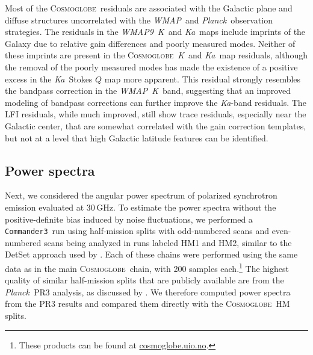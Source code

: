 \documentclass[twocolumn]{../../common/aa}
\def\WMAP{\emph{WMAP}}
\def\WMAPnine{\emph{WMAP9}}
\def\Planck{\emph{Planck}}
\def\commanderthree{\texttt{Commander3}}
\newcommand{\cosmoglobe}{\textsc{Cosmoglobe}}
\newcommand{\K}[0]{\textit K}
\newcommand{\Ka}[0]{\textit{Ka}}
\begin{document}
Most of the \cosmoglobe\ residuals are associated with the Galactic plane and diffuse structures uncorrelated with the \WMAP\ and \Planck\ observation strategies. 
The residuals in the \WMAPnine\ \K\ and \Ka\ maps include imprints of the Galaxy due to relative gain differences and poorly measured modes. Neither of these imprints are present in the \cosmoglobe\ \K\ and \Ka\ map residuals, although the removal of the poorly measured modes has made the existence of a positive excess in the \Ka\ Stokes $Q$ map more apparent.
This residual  strongly resembles the bandpass correction in the \WMAP\ \K\ band, suggesting that an improved modeling of bandpass corrections can further improve the \Ka-band residuals.
The LFI residuals, while much improved, still show trace residuals, especially near the Galactic center, that are somewhat correlated with the gain correction templates, but not at a level that high Galactic latitude features can be identified. 



\subsection{Power spectra}
\label{sec:powspec}


Next, we considered the angular power spectrum of polarized synchrotron emission evaluated at 30\,GHz. To estimate the power spectra without the positive-definite bias induced by noise fluctuations, we performed a \commanderthree\ run using half-mission splits with odd-numbered scans and even-numbered scans being analyzed in runs labeled HM1 and HM2, similar to the DetSet approach used by \citet{planck2014-XXX}. Each of these chains were performed using the same data as in the main \cosmoglobe\ chain, with 200 samples each.\footnote{These products can be found at \url{cosmoglobe.uio.no}.}
The highest quality of similar half-mission splits that are publicly available are from the \Planck\ PR3 analysis, as discussed by \citet{planck2016-l04}. We therefore computed power spectra from the PR3 results and compared them directly with the \cosmoglobe\ HM splits.
\end{document}
